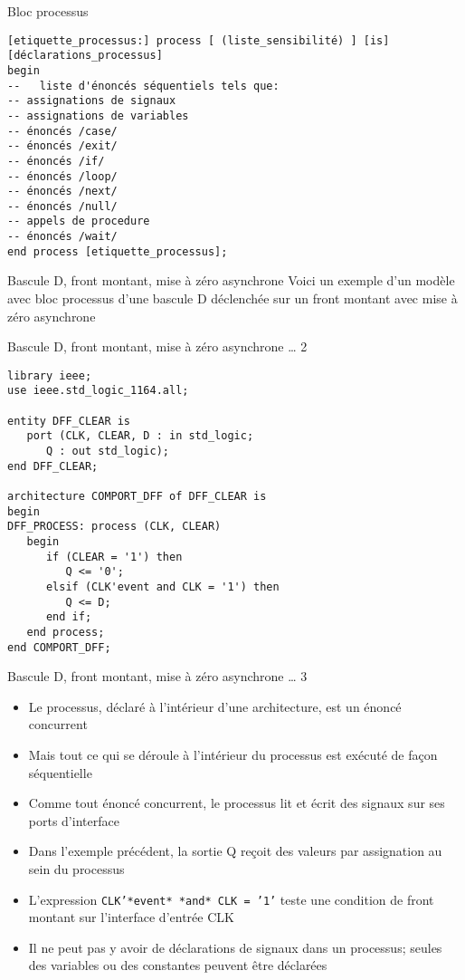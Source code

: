 \documentclass[presentation]{beamer}
\begin{document}
\begin{frame}[label={sec:org6d06b74},fragile]{Bloc processus}
 \begin{verbatim}
[etiquette_processus:] process [ (liste_sensibilité) ] [is]
[déclarations_processus]
begin
--   liste d'énoncés séquentiels tels que:
-- assignations de signaux 
-- assignations de variables
-- énoncés /case/
-- énoncés /exit/
-- énoncés /if/ 
-- énoncés /loop/ 
-- énoncés /next/
-- énoncés /null/
-- appels de procedure
-- énoncés /wait/
end process [etiquette_processus];
\end{verbatim}
\end{frame}

\begin{frame}[label={sec:org34b8a7f}]{Bascule D, front montant, mise à zéro asynchrone}
Voici un exemple d'un modèle avec bloc processus d'une bascule D déclenchée sur un front montant avec mise à zéro asynchrone
\end{frame}

\begin{frame}[label={sec:org361b1b9},fragile]{Bascule D, front montant, mise à zéro asynchrone \ldots{} 2}
 \begin{verbatim}
library ieee;
use ieee.std_logic_1164.all;

entity DFF_CLEAR is
   port (CLK, CLEAR, D : in std_logic;
      Q : out std_logic);
end DFF_CLEAR;

architecture COMPORT_DFF of DFF_CLEAR is
begin
DFF_PROCESS: process (CLK, CLEAR)
   begin
      if (CLEAR = '1') then
         Q <= '0';
      elsif (CLK'event and CLK = '1') then
         Q <= D;
      end if;
   end process;
end COMPORT_DFF;
\end{verbatim}
\end{frame}

\begin{frame}[label={sec:orgc7bde94},fragile]{Bascule D, front montant, mise à zéro asynchrone \ldots{} 3}
 \begin{itemize}
\item Le processus, déclaré à l'intérieur d'une architecture, est un énoncé concurrent
\item Mais tout ce qui se déroule à l'intérieur du processus est exécuté de façon séquentielle
\item Comme tout énoncé concurrent, le processus lit et écrit des signaux sur ses ports d'interface
\item Dans l'exemple précédent, la sortie Q reçoit des valeurs par assignation au sein du processus
\item L'expression \texttt{CLK'*event* *and* CLK = '1'} teste une condition de front montant sur l'interface d'entrée CLK
\item Il ne peut pas y avoir de déclarations de signaux dans un processus; seules des variables ou des constantes peuvent être déclarées
\end{itemize}
\end{frame}
\end{document}
